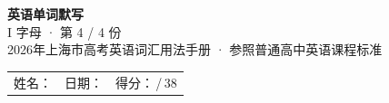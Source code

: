 \documentclass[10pt,a4paper]{article}
\begin{document}
\pagestyle{plain}

\begin{center}
{\LARGE\bfseries 英语单词默写}\\[0.22em]
{\large I 字母 · 第 4 / 4 份}\\[0.18em]
{\small 2026年上海市高考英语词汇用法手册 · 参照普通高中英语课程标准}
\end{center}

\vspace{0.25em}
\noindent\begin{tabular}{@{}p{}@{}p{}@{}p{}@{}}
姓名：\underline{\hspace{2.0cm}} & 日期：\underline{\hspace{2.0cm}} & 得分：\underline{\hspace{1.3cm}}\,/\,38 \\
\end{tabular}

\vspace{0.3em}

\vspace{0.08em}
\end{document}
